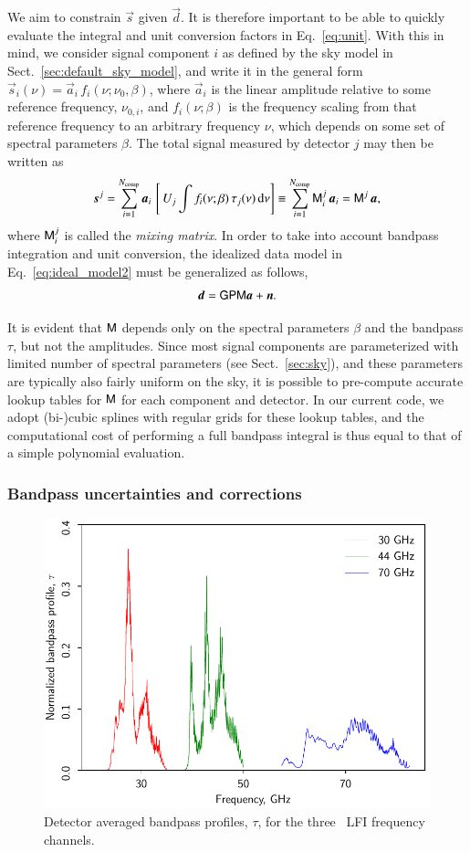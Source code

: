 \documentclass[onecolumn]{aa}
\renewcommand{\d}[0]{\vec{d}}
\newcommand{\n}[0]{\vec{n}}
\newcommand{\s}[0]{\vec{s}}
\renewcommand{\a}[0]{\vec{a}}
\newcommand{\M}[0]{\tens{M}}
\renewcommand{\P}[0]{\tens{P}}
\renewcommand{\G}[0]{\tens{G}}
\begin{document}
We aim to constrain $\s$ given $\d$. It is
therefore important to be able to quickly evaluate the integral and
unit conversion factors in Eq.~\eqref{eq:unit}. With this in mind, we
consider signal component $i$ as defined by the sky model in
Sect.~\ref{sec:default_sky_model}, and write it in the general form
$\s_i(\nu) = \a_i\,f_i(\nu; \nu_0, \beta)$, where $\a_i$ is the linear
amplitude relative to some reference frequency, $\nu_{0,i}$, and
$f_i(\nu; \beta)$ is the frequency scaling from that reference
frequency to an arbitrary frequency $\nu$, which depends on some set
of spectral parameters $\beta$. The total signal measured by detector
$j$ may then be written as
\begin{equation}
  \s^j = \sum_{i=1}^{N_{\mathrm{comp}}}\a_i\, \left[\,U_j \int f_i(\nu; \beta)\,
    \tau_j(\nu)\,\mathrm d\nu\right] \equiv
  \sum_{i=1}^{N_{\mathrm{comp}}}\M^j_i\,\a_i = \M^j\,\a,
  \label{eq:mixmat}
\end{equation}
where $\M^j_i$ is called the \emph{mixing matrix}. In order to take
into account bandpass integration and unit conversion, the idealized data
model in Eq.~\eqref{eq:ideal_model2} must be generalized as
follows,
\begin{equation}
  \d = \G\P\M\a + \n.
  \label{eq:ideal_model_bp}
\end{equation}

It is evident that $\M$ depends only on the spectral parameters
$\beta$ and the bandpass $\tau$, but not the amplitudes. Since most
signal components are parameterized with limited number of spectral
parameters (see Sect.~\ref{sec:sky}), and these parameters are
typically also fairly uniform on the sky, it is possible to pre-compute
accurate lookup tables for $\M$ for each component and detector. In
our current code, we adopt (bi-)cubic splines with regular grids for
these lookup tables, and the computational cost of performing a full
bandpass integral is thus equal to that of a simple polynomial
evaluation.



\subsubsection{Bandpass uncertainties and corrections}

\begin{figure}[t]
  \center
  \includegraphics[width=0.5\linewidth]{figs/bp_LFI_v1.pdf}
  \caption{Detector averaged bandpass profiles, $\tau$, for the three
    \Planck\ LFI frequency channels. }
  \label{fig:bp_LFI}
\end{figure}
\end{document}

